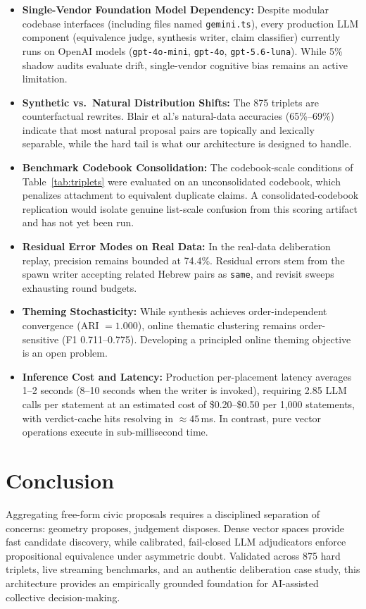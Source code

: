 \documentclass{article}
\begin{document}
\begin{itemize}
\item \textbf{Single-Vendor Foundation Model Dependency:} Despite modular codebase interfaces (including files named \texttt{gemini.ts}), every production LLM component (equivalence judge, synthesis writer, claim classifier) currently runs on OpenAI models (\texttt{gpt-4o-mini}, \texttt{gpt-4o}, \texttt{gpt-5.6-luna}). While 5\% shadow audits evaluate drift, single-vendor cognitive bias remains an active limitation.
\item \textbf{Synthetic vs.\ Natural Distribution Shifts:} The 875 triplets are counterfactual rewrites. Blair et al.'s natural-data accuracies (65\%--69\%) indicate that most natural proposal pairs are topically and lexically separable, while the hard tail is what our architecture is designed to handle.
\item \textbf{Benchmark Codebook Consolidation:} The codebook-scale conditions of Table~\ref{tab:triplets} were evaluated on an unconsolidated codebook, which penalizes attachment to equivalent duplicate claims. A consolidated-codebook replication would isolate genuine list-scale confusion from this scoring artifact and has not yet been run.
\item \textbf{Residual Error Modes on Real Data:} In the real-data deliberation replay, precision remains bounded at 74.4\%. Residual errors stem from the spawn writer accepting related Hebrew pairs as \texttt{same}, and revisit sweeps exhausting round budgets.
\item \textbf{Theming Stochasticity:} While synthesis achieves order-independent convergence (ARI $=1.000$), online thematic clustering remains order-sensitive (F1 0.711--0.775). Developing a principled online theming objective is an open problem.
\item \textbf{Inference Cost and Latency:} Production per-placement latency averages 1--2 seconds (8--10 seconds when the writer is invoked), requiring 2.85 LLM calls per statement at an estimated cost of \$0.20--\$0.50 per 1,000 statements, with verdict-cache hits resolving in $\approx 45$\,ms. In contrast, pure vector operations execute in sub-millisecond time.
\end{itemize}

\section{Conclusion}

Aggregating free-form civic proposals requires a disciplined separation of concerns: geometry proposes, judgement disposes. Dense vector spaces provide fast candidate discovery, while calibrated, fail-closed LLM adjudicators enforce propositional equivalence under asymmetric doubt. Validated across 875 hard triplets, live streaming benchmarks, and an authentic deliberation case study, this architecture provides an empirically grounded foundation for AI-assisted collective decision-making.
\end{document}
